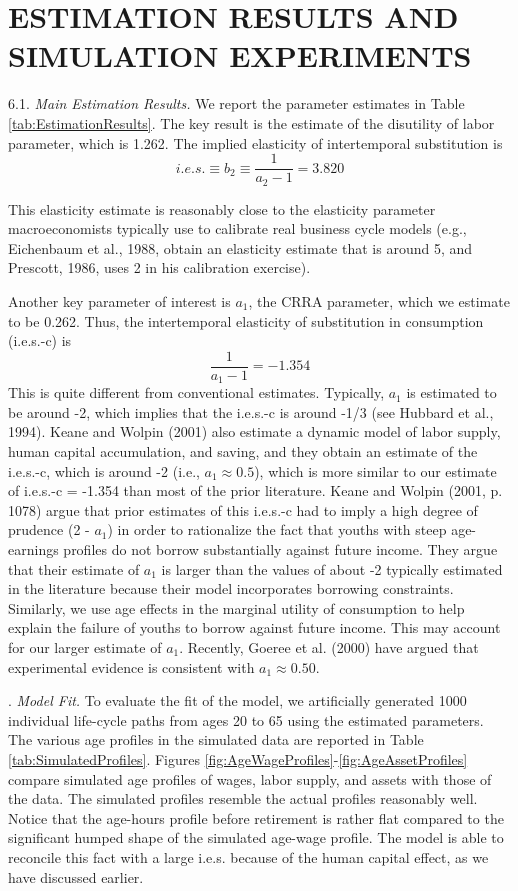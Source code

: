\documentclass{article}
\begin{document}
\section{ESTIMATION RESULTS AND SIMULATION EXPERIMENTS}
\label{section:estimation}
6.1.     \textit{Main Estimation Results.}    We report the parameter estimates in Table \ref{tab:EstimationResults}. The key result is the estimate of the disutility of labor parameter, which is 1.262. The implied elasticity of intertemporal substitution is
$$ i.e.s. \equiv b_2 \equiv \dfrac{1}{a_2-1} = 3.820 $$

This elasticity estimate is reasonably close to the elasticity parameter macroeconomists typically use to calibrate real business cycle models (e.g., Eichenbaum et al., 1988, obtain an elasticity estimate that is around 5, and Prescott, 1986, uses 2 in his calibration exercise). \par
Another key parameter of interest is $a_1$, the CRRA parameter, which we estimate to be 0.262. Thus, the intertemporal elasticity of substitution in consumption (i.e.s.-c) is
$$ \dfrac{1}{a_1-1} = -1.354$$
This is quite different from conventional estimates. Typically, $a_1$ is estimated to be around -2, which implies that the i.e.s.-c is around -1/3 (see Hubbard et al., 1994). Keane and Wolpin (2001) also estimate a dynamic model of labor supply, human capital accumulation, and saving, and they obtain an estimate of the i.e.s.-c, which is around -2 (i.e., $a_1 \approx 0.5$), which is more similar to our estimate of i.e.s.-c = -1.354 than most of the prior literature. Keane and Wolpin (2001, p. 1078) argue that prior estimates of this i.e.s.-c had to imply a high degree of prudence (2 - $a_1$) in order to rationalize the fact that youths with steep age-earnings profiles do not borrow substantially against future income. They argue that their estimate of $a_1$ is larger than the values of about -2 typically estimated in the literature because their model incorporates borrowing constraints. Similarly, we use age effects in the marginal utility of consumption to help explain the failure of youths to borrow against future income. This may account for our larger estimate of $a_1$. Recently, Goeree et al. (2000) have argued that experimental evidence is consistent with $a_1 \approx 0.50$. \par

.     \textit{Model Fit.}     To evaluate the fit of the model, we artificially generated 1000 individual life-cycle paths from ages 20 to 65 using the estimated parameters. The various age profiles in the simulated data are reported in Table \ref{tab:SimulatedProfiles}. Figures \ref{fig:AgeWageProfiles}-\ref{fig:AgeAssetProfiles} compare simulated age profiles of wages, labor supply, and assets with those of the data. The simulated profiles resemble the actual profiles reasonably well. Notice that the age-hours profile before retirement is rather flat compared to the significant humped shape of the simulated age-wage profile. The model is able to reconcile this fact with a large i.e.s. because of the human capital effect, as we have discussed earlier. \par
\end{document}
